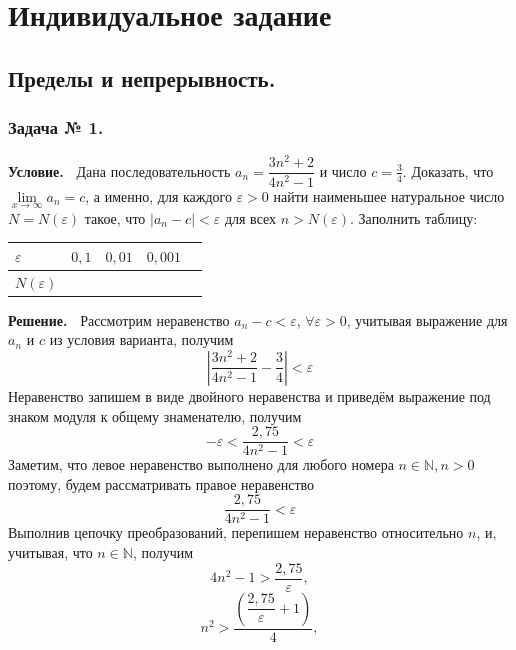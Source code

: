 \documentclass[12pt]{article}
\begin{document}
\section{Индивидуальное задание}
%
\subsection{Пределы и непрерывность.}
\subsubsection*{\center Задача № 1.}
{\bf Условие.~}
Дана последовательность $a_{n}=\dfrac{3n^2 + 2}{4n^2 - 1}$ и число $c=\frac{3}{4}$. Доказать, что $\lim\limits_{x\rightarrow\infty} a_{n}=c $, а именно, для каждого $\varepsilon>0$ найти наименьшее натуральное число  $N{=}N(\varepsilon)$ такое, что $|a_{n}-c|<\varepsilon$ для всех $n>N(\varepsilon)$. Заполнить таблицу: 
\begin{center}
	\begin{tabular}{ | p{25pt} | c | c | c | c |}
		\hline
		$\varepsilon$& $0{,}1$ & $0{,}01$ & $0{,}001$ \\ \hline
		$N(\varepsilon)$ &   &   &\\
		\hline
	\end{tabular}
\end{center}
\medskip
{\bf Решение.~}
Рассмотрим неравенство $a_{n}-c<\varepsilon$, $\forall\varepsilon>0$, учитывая выражение для $a_{n}$ и $c$ из условия варианта, получим 
$$\left|\frac{3n^2 + 2}{4n^2 - 1}-\frac{3}{4}\right|<\varepsilon$$
Неравенство запишем в виде двойного неравенства и приведём выражение под знаком модуля к общему знаменателю, получим
$${-}\varepsilon <\dfrac{2{,}75}{4n^2 - 1}<\varepsilon$$
Заметим, что левое неравенство выполнено для любого номера $n\in \mathbb{N}, n > 0$ поэтому, будем рассматривать правое неравенство
$$\frac{2{,}75}{4n^2 - 1}<\varepsilon$$
Выполнив цепочку преобразований, перепишем неравенство относительно $n$, и, учитывая, что $n\in \mathbb{N}$, получим 
$$4n^2 - 1>\dfrac{2{,}75}{\varepsilon},$$
$$n^2>\frac{(\dfrac{2{,}75}{\varepsilon} + 1)}{4},$$
\end{document}

